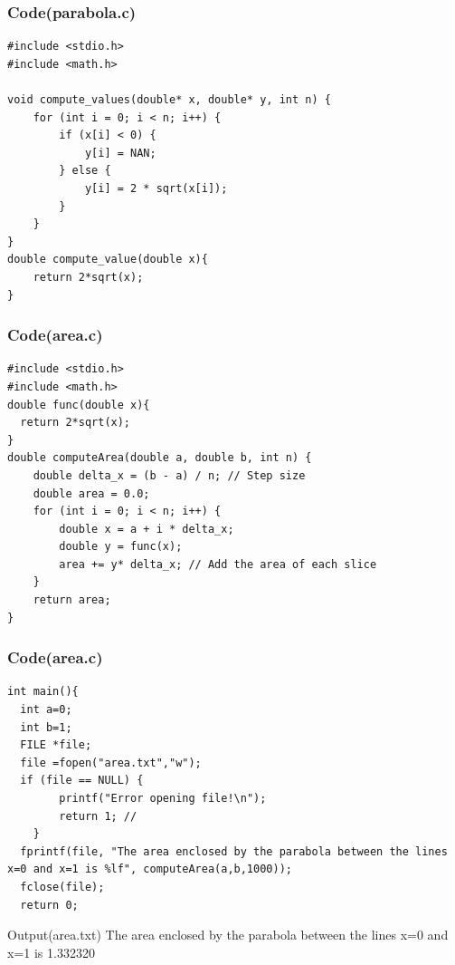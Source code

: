 \documentclass{beamer}
\begin{document}
\begin{frame}[fragile]
\frametitle{Code(parabola.c)}
\begin{verbatim}
#include <stdio.h>
#include <math.h>

void compute_values(double* x, double* y, int n) {
    for (int i = 0; i < n; i++) {
        if (x[i] < 0) {
            y[i] = NAN; 
        } else {
            y[i] = 2 * sqrt(x[i]);
        }
    }
}
double compute_value(double x){
	return 2*sqrt(x);
}
\end{verbatim}
\end{frame}
\begin{frame}[fragile]
  \frametitle{Code(area.c)}

\begin{verbatim}
#include <stdio.h>
#include <math.h>
double func(double x){
  return 2*sqrt(x);
}
double computeArea(double a, double b, int n) {
    double delta_x = (b - a) / n; // Step size
    double area = 0.0;
    for (int i = 0; i < n; i++) {
        double x = a + i * delta_x;
        double y = func(x);
        area += y* delta_x; // Add the area of each slice
    }
    return area;
}

\end{verbatim}
\end{frame}
\begin{frame}[fragile]
  \frametitle{Code(area.c)}

\begin{verbatim}
int main(){
  int a=0;
  int b=1;
  FILE *file;
  file =fopen("area.txt","w");
  if (file == NULL) {
        printf("Error opening file!\n");
        return 1; //
    }
  fprintf(file, "The area enclosed by the parabola between the lines x=0 and x=1 is %lf", computeArea(a,b,1000));
  fclose(file);
  return 0;
\end{verbatim}
\end{frame}
\begin{frame}{Output(area.txt)}
The area enclosed by the parabola between the lines x=0 and x=1 is 1.332320  
\end{frame}
\end{document}

